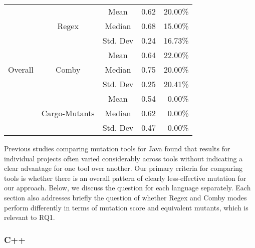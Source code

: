 \documentclass[sigconf,review, anonymous]{acmart}
\begin{document}
{\begin{table}[htbp]
{\begin{tabular}{|c|c|r|r|r|r|}
\multirow{9}{*}{Overall} & \multirow{3}{*}{Regex} & \multicolumn{2}{c|}{Mean} & 0.62  & 20.00\%\\\cline{3-6}
    &   &  \multicolumn{2}{c|}{Median} & 0.68 & 15.00\%\\\cline{3-6}
    &   &  \multicolumn{2}{c|}{Std. Dev} & 0.24 & 16.73\% \\\cline{2-6}

 & \multirow{3}{*}{Comby} & \multicolumn{2}{c|}{Mean} & 0.64 & 22.00\%\\\cline{3-6}
    &   &  \multicolumn{2}{c|}{Median} & 0.75 & 20.00\% \\\cline{3-6}
    &   &  \multicolumn{2}{c|}{Std. Dev} & 0.25 & 20.41\% \\\cline{2-6}

 & \multirow{3}{*}{Cargo-Mutants} & \multicolumn{2}{c|}{Mean} & 0.54 & 0.00\%\\\cline{3-6}
    &   &  \multicolumn{2}{c|}{Median} & 0.62 & 0.00\% \\\cline{3-6}
    &   &  \multicolumn{2}{c|}{Std. Dev} & 0.47 & 0.00\%\\ \hline
    
    
\end{tabular}
}
\end{table}

Previous studies comparing mutation tools for Java
\cite{MajorPIT,gopinath2017does,CommACMJavaTool} found that results
for individual projects often varied considerably across tools without
indicating a clear advantage for one tool over another.  Our primary
criteria for comparing tools is whether there is an overall pattern of
clearly less-effective mutation for our approach.  Below, we discuss
the question for each language separately.  Each section also
addresses briefly the question of whether Regex and Comby modes
perform differently in terms of mutation score and equivalent mutants,
which is relevant to RQ1.

\subsubsection{C++}

}
\end{document}
